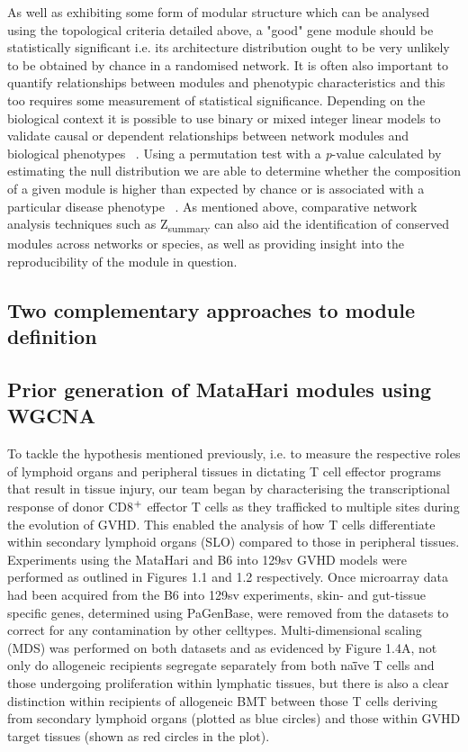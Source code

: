 As well as exhibiting some form of modular structure which can be analysed using the topological criteria detailed above, a "good" gene module should be statistically significant i.e. its architecture distribution ought to be very unlikely to be obtained by chance in a randomised network. It is often also important to quantify relationships between modules and phenotypic characteristics and this too requires some measurement of statistical significance. Depending on the biological context it is possible to use binary or mixed integer linear models to validate causal or dependent relationships between network modules and biological phenotypes ~\autocite{Hen2011,Sch2011,Shi2010}. Using a permutation test with a \textit{p}-value calculated by estimating the null distribution we are able to determine whether the composition of a given module is higher than expected by chance or is associated with a particular disease phenotype ~\autocite{Jia2012}. As mentioned above, comparative network analysis techniques such as Z\textsubscript{summary} can also aid the identification of conserved modules across networks or species, as well as providing insight into the reproducibility of the module in question. 


\subsection{Two complementary approaches to module definition}

\subsection{Prior generation of MataHari modules using WGCNA}

To tackle the hypothesis mentioned previously, i.e. to measure the respective roles of lymphoid organs and peripheral tissues in dictating T cell effector programs that result in tissue injury, our team began by characterising the transcriptional response of donor CD8$\textsuperscript{+}$ effector T cells as they trafficked to multiple sites during the evolution of GVHD. This enabled the analysis of how T cells differentiate within secondary lymphoid organs (SLO) compared to those in peripheral tissues. Experiments using the MataHari and B6 into 129sv GVHD models were performed as outlined in Figures 1.1 and 1.2 respectively. Once microarray data had been acquired from the B6 into 129sv experiments, skin- and gut-tissue specific genes, determined using PaGenBase, were removed from the datasets to correct for any contamination by other celltypes. Multi-dimensional scaling (MDS) was performed on both datasets and as evidenced by Figure 1.4A, not only do allogeneic recipients segregate separately from both na\"ïve T cells and those undergoing proliferation within lymphatic tissues, but there is also a clear distinction within recipients of allogeneic BMT between those T cells deriving from secondary lymphoid organs (plotted as blue circles) and those within GVHD target tissues (shown as red circles in the plot). 

